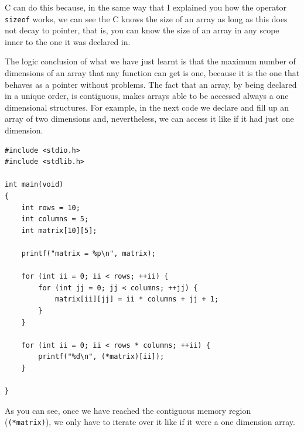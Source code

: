 \documentclass[a4paper]{article}
\begin{document}
C can do this because, in the same way that I explained you how the operator
\verb!sizeof! works, we can see the C knows the size of an array as long as this
does not decay to pointer, that is, you can know the size of an array in any
scope inner to the one it was declared in.

The logic conclusion of what we have just learnt is that the maximum number of
dimensions of an array that any function can get is one, because it is the one
that behaves as a pointer without problems. The fact that an array, by being
declared in a unique order, is contiguous, makes arrays able to be accessed
always a one dimensional structures. For example, in the next code we declare and
fill up an array of two dimensions and, nevertheless, we can access it like if
it had just one dimension.

\noindent
\begin{minipage}[H]{\linewidth}
\mbox{}
\begin{lstlisting}[style=C,
caption={Using a bidimensional array like a one-dimension structure},
label={lst:bidimensionalArrayAsOneDimension}]
#include <stdio.h>
#include <stdlib.h>

int main(void)
{
    int rows = 10;
    int columns = 5;
    int matrix[10][5];

    printf("matrix = %p\n", matrix);

    for (int ii = 0; ii < rows; ++ii) {
        for (int jj = 0; jj < columns; ++jj) {
            matrix[ii][jj] = ii * columns + jj + 1;
        }
    }

    for (int ii = 0; ii < rows * columns; ++ii) {
        printf("%d\n", (*matrix)[ii]);
    }

}
\end{lstlisting}
\end{minipage}

As you can see, once we have reached the contiguous memory region
(\verb!(*matrix)!), we only have to iterate over it like if it were a one
dimension array.
\end{document}
